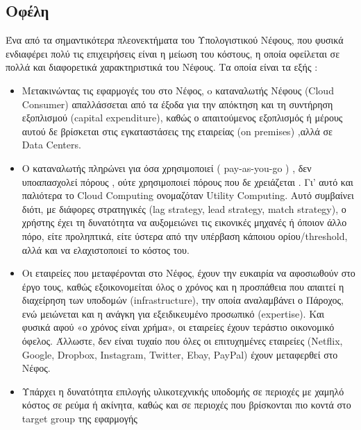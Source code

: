 \documentclass{article}
\begin{document}
\subsection{Οφέλη}
Ένα από τα σημαντικότερα πλεονεκτήματα του Υπολογιστικού Νέφους, που φυσικά ενδιαφέρει πολύ τις επιχειρήσεις είναι η μείωση του κόστους, η οποία οφείλεται σε πολλά και διαφορετικά χαρακτηριστικά του Νέφους. Τα οποία είναι τα εξής :
\begin{itemize}
\item	Μετακινώντας τις εφαρμογές του στο Νέφος, o καταναλωτής Νέφους (Cloud Consumer) απαλλάσσεται από τα έξοδα για την απόκτηση και τη συντήρηση εξοπλισμού (capital expenditure), καθώς ο απαιτούμενος εξοπλισμός ή μέρους αυτού δε βρίσκεται στις εγκαταστάσεις της εταιρείας (on premises) ,αλλά σε Data Centers.

\item	Ο καταναλωτής πληρώνει για όσα χρησιμοποιεί ( pay-as-you-go ) , δεν υποαπασχολεί πόρους , ούτε χρησιμοποιεί πόρους που δε χρειάζεται . Γι’ αυτό και παλιότερα το Cloud Computing ονομαζόταν Utility Computing. Αυτό συμβαίνει διότι, με διάφορες στρατηγικές (lag strategy, lead strategy, match strategy), ο χρήστης έχει τη δυνατότητα να αυξομειώνει τις εικονικές μηχανές ή όποιον άλλο πόρο, είτε προληπτικά, είτε ύστερα από την υπέρβαση κάποιου ορίου/threshold, αλλά και να ελαχιστοποιεί το κόστος του.

\item	Οι εταιρείες που μεταφέρονται στο Νέφος, έχουν την ευκαιρία να αφοσιωθούν στο έργο τους, καθώς εξοικονομείται όλος ο χρόνος και η προσπάθεια που απαιτεί η διαχείρηση των υποδομών (infrastructure), την οποία αναλαμβάνει ο Πάροχος, ενώ μειώνεται και η ανάγκη για εξειδικευμένο προσωπικό (expertise). Και φυσικά αφού «ο χρόνος είναι χρήμα», οι εταιρείες έχουν τεράστιο οικονομικό όφελος. Άλλωστε, δεν είναι τυχαίο που όλες οι επιτυχημένες εταιρείες (Netflix, Google, Dropbox, Instagram, Twitter, Ebay, PayPal) έχουν μεταφερθεί στο Νέφος.

\item	Υπάρχει η δυνατότητα επιλογής υλικοτεχνικής υποδομής σε περιοχές με χαμηλό κόστος σε ρεύμα ή ακίνητα, καθώς και σε περιοχές που βρίσκονται πιο κοντά στο target group της εφαρμογής

\end{itemize}
\end{document}
